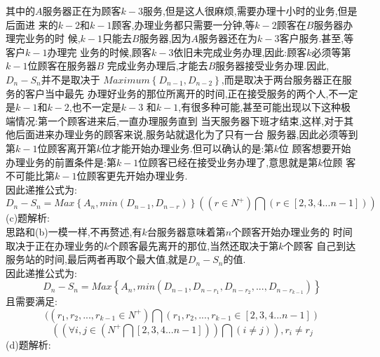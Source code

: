 \documentclass{book}
\begin{document}
其中的$A$服务器正在为顾客$k-3$服务,但是这人很麻烦,需要办理十小时的业务,但是后面进
来的$k-2$和$k-1$顾客,办理业务都只需要一分钟,等$k-2$顾客在$B$服务器办理完业务的时
候,$k-1$只能去$B$服务器,因为$A$服务器还在为$k-3$客户服务.甚至,等客户$k-1$办理完
业务的时候,顾客$k-3$依旧未完成业务办理,因此:顾客$k$必须等第$k-1$位顾客在服务器$B$
完成业务办理后,才能去$B$服务器接受业务办理.因此,$D_{n}-S_{n}$并不是取决于
$Maximum\left\{D_{n-1},D_{n-2}\right\}$,而是取决于两台服务器正在服务的客户当中最先
办理好业务的那位所离开的时间,正在接受服务的两个人,不一定是$k-1$和$k-2$,也不一定是$k-3$
和$k-1$,有很多种可能,甚至可能出现以下这种极端情况:第一个顾客进来后,一直办理服务直到
当天服务器下班才结束,这样,对于其他后面进来办理业务的顾客来说,服务站就退化为了只有一台
服务器,因此必须等到第$k-1$位顾客离开第$k$位才能开始办理业务.但可以确认的是:第$k$位
顾客想要开始办理业务的前置条件是:第$k-1$位顾客已经在接受业务办理了,意思就是第$k$位顾
客不可能比第$k-1$位顾客更先开始办理业务. \\
因此递推公式为:
$$
    D_{n} - S_{n} = Max\left\{A_{n},min(D_{n-1},D_{n-r})\right\} ((r \in N^{+})
    \bigcap (r \in [2,3,4...n-1]))
$$
(c)题解析: \\
思路和(b)一模一样,不再赘述,有$k$台服务器意味着第$n$个顾客开始办理业务的
时间取决于正在办理业务的$k$个顾客最先离开的那位,当然还取决于第$k$个顾客
自己到达服务站的时间,最后两者再取个最大值,就是$D_{n} - S_{n}$的值. \\
因此递推公式为:
$$
    D_{n} - S_{n} = Max\left\{A_{n},min(D_{n-1},D_{n-r_{1}},D_{n-r_{2}},
    ..., D_{n-r_{k-1}})\right\}
$$
且需要满足: \\
$$
    ((r_{1},r_{2},...,r_{k-1} \in N^{+})\bigcap (r_{1},r_{2},...,
    r_{k-1} \in [2,3,4...n-1])
$$
$$
    ((\forall i,j \in (N^{+} \bigcap  [2,3,4...n-1])) \bigcap (i \neq j)), r_{i} \neq r_{j}
$$
(d)题解析: \\
\lstset{language = C++}
\end{document}
